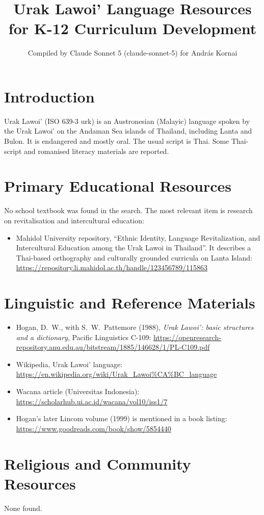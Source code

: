 \documentclass[12pt]{article}
\title{Urak Lawoi' Language Resources for K-12 Curriculum Development}
\author{Compiled by Claude Sonnet 5 (claude-sonnet-5) for Andr\'as Kornai}
\date{}
\begin{document}
\maketitle

\section{Introduction}
Urak Lawoi' (ISO 639-3 urk) is an Austronesian (Malayic) language spoken by the Urak Lawoi' on the Andaman Sea islands of Thailand, including Lanta and Bulon. It is endangered and mostly oral. The usual script is Thai. Some Thai-script and romanised literacy materials are reported.

\section{Primary Educational Resources}
No school textbook was found in the search. The most relevant item is research on revitalisation and intercultural education:
\begin{itemize}
\item Mahidol University repository, ``Ethnic Identity, Language Revitalization, and Intercultural Education among the Urak Lawoi in Thailand''. It describes a Thai-based orthography and culturally grounded curricula on Lanta Island: \url{https://repository.li.mahidol.ac.th/handle/123456789/115863}
\end{itemize}

\section{Linguistic and Reference Materials}
\begin{itemize}
\item Hogan, D.\ W., with S.\ W.\ Pattemore (1988), \emph{Urak Lawoi': basic structures and a dictionary}, Pacific Linguistics C-109: \url{https://openresearch-repository.anu.edu.au/bitstream/1885/146628/1/PL-C109.pdf}
\item Wikipedia, Urak Lawoi' language: \url{https://en.wikipedia.org/wiki/Urak_Lawoi%CA%BC_language}
\item Wacana article (Universitas Indonesia): \url{https://scholarhub.ui.ac.id/wacana/vol10/iss1/7}
\item Hogan's later Lincom volume (1999) is mentioned in a book listing: \url{https://www.goodreads.com/book/show/5854440}
\end{itemize}

\section{Religious and Community Resources}
None found.
\end{document}
